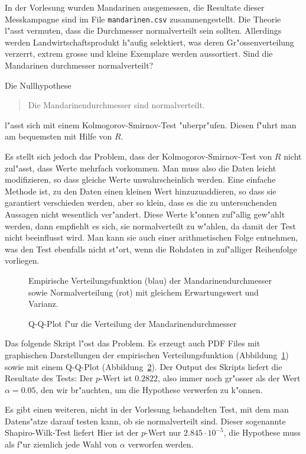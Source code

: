 In der Vorlesung wurden Mandarinen ausgemessen, die Resultate dieser
Messkampagne sind im File \texttt{mandarinen.csv} zusammengestellt.
Die Theorie l"asst vermuten, dass die Durchmesser normalverteilt sein
sollten. Allerdings werden Landwirtschaftsprodukt h"aufig selektiert,
was deren Gr"ossenverteilung verzerrt, extrem grosse und kleine
Exemplare werden aussortiert. Sind die Mandarinen durchmesser normalverteilt?

\begin{loesung}
Die Nullhypothese
\begin{quote}
Die Mandarinendurchmesser sind normalverteilt.
\end{quote}
l"asst sich mit einem Kolmogorov-Smirnov-Test "uberpr"ufen. Diesen f"uhrt
man am bequemsten mit Hilfe von $R$.

Es stellt sich jedoch das Problem,
dass der Kolmogorov-Smirnov-Test von $R$ nicht zul"asst, dass Werte
mehrfach vorkommen. Man muss also die Daten leicht modifizieren, so
dass gleiche Werte unwahrscheinlich werden. Eine einfache Methode ist,
zu den Daten einen kleinen Wert hinzuzuaddieren, so dass sie garantiert
verschieden werden, aber so klein, dass es die zu untersuchenden Aussagen
nicht wesentlich ver"andert. Diese Werte k"onnen zuf"allig gew"ahlt werden,
dann empfiehlt es sich, sie normalverteilt zu w"ahlen, da damit der Test
nicht beeinflusst wird. Man kann sie auch einer arithmetischen Folge
entnehmen, was den Test ebenfalls nicht st"ort, wenn die Rohdaten in
zuf"alliger Reihenfolge vorliegen.

\begin{figure}
\begin{center}
\end{center}
\caption{Empirische Verteilungsfunktion (blau) der Mandarinendurchmesser
sowie Normalverteilung (rot) mit gleichem Erwartungswert und Varianz.
\label{80000022:ecdf}}
\end{figure}
\begin{figure}
\begin{center}
\end{center}
\caption{Q-Q-Plot f"ur die Verteilung der Mandarinendurchmesser
\label{80000022:qq}}
\end{figure}

Das folgende Skript l"ost das Problem. Es erzeugt auch PDF Files mit
graphischen Darstellungen der empirischen Verteilungsfunktion
(Abbildung~\ref{80000022:ecdf}) sowie mit einem Q-Q-Plot
(Abbildung~\ref{80000022:qq}).
{\small
{}
}
Der Output des Skripts liefert die Resultate des Tests:
Der $p$-Wert ist $0.2822$, also immer noch gr"osser als der Wert
$\alpha = 0.05$, den wir br"auchten, um die Hypothese verwerfen zu k"onnen.

Es gibt einen weiteren, nicht in der Vorlesung behandelten Test, mit dem
man Datens"atze darauf testen kann, ob sie normalverteilt sind. Dieser
sogenannte Shapiro-Wilk-Test liefert 
Hier ist der $p$-Wert nur $2.845\cdot 10^{-5}$, die Hypothese muss
als f"ur ziemlich jede Wahl von $\alpha$ verworfen werden.
\end{loesung}

